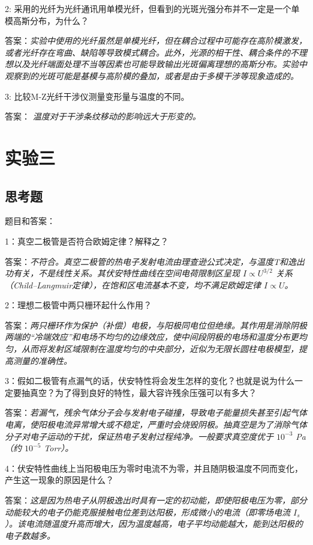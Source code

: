 \documentclass[10pt,journal,compsoc]{IEEEtran}
\begin{document}
2: 采用的光纤为光纤通讯用单模光纤，但看到的光斑光强分布并不一定是一个单模高斯分布，为什么？

答案：\textit{实验中使用的光纤虽然是单模光纤，但在耦合过程中可能存在高阶模激发，或者光纤存在弯曲、缺陷等导致模式耦合。此外，光源的相干性、耦合条件的不理想以及光纤端面处理不当等因素也可能导致输出光斑偏离理想的高斯分布。实验中观察到的光斑可能是基模与高阶模的叠加，或者是由于多模干涉等现象造成的。}

3: 比较M-Z光纤干涉仪测量变形量与温度的不同。

答案：
\textit{
  温度对于干涉条纹移动的影响远大于形变的。
    }
\section{实验三}
\subsection{思考题}
题目和答案：

1：真空二极管是否符合欧姆定律？解释之？

答案：\textit{不符合。真空二极管的热电子发射电流由理查逊公式决定，与温度T和逸出功有关，不是线性关系。其伏安特性曲线在空间电荷限制区呈现 $I \propto U^{3/2}$ 关系（Child–Langmuir定律），在饱和区电流基本不变，均不满足欧姆定律 $I \propto U$。}

2：理想二极管中两只栅环起什么作用？

答案：\textit{两只栅环作为保护（补偿）电极，与阳极同电位但绝缘。其作用是消除阴极两端的“冷端效应”和电场不均匀的边缘效应，使中间段阴极的电场和温度分布更均匀，从而将发射区域限制在温度均匀的中央部分，近似为无限长圆柱电极模型，提高测量的准确性。}

3：假如二极管有点漏气的话，伏安特性将会发生怎样的变化？也就是说为什么一定要抽真空？为了得到良好的特性，最大容许残余压强可以有多大？

答案：\textit{若漏气，残余气体分子会与发射电子碰撞，导致电子能量损失甚至引起气体电离，使阳极电流异常增大或不稳定，严重时会烧毁阴极。抽真空是为了消除气体分子对电子运动的干扰，保证热电子发射过程纯净。一般要求真空度优于 $10^{-3}$ Pa（约 $10^{-5}$ Torr）。}

4：伏安特性曲线上当阳极电压为零时电流不为零，并且随阴极温度不同而变化，产生这一现象的原因是什么？

答案：\textit{这是因为热电子从阴极逸出时具有一定的初动能，即使阳极电压为零，部分动能较大的电子仍能克服接触电位差到达阳极，形成微小的电流（即零场电流 $I_s$）。该电流随温度升高而增大，因为温度越高，电子平均动能越大，能到达阳极的电子数越多。}
\end{document}
